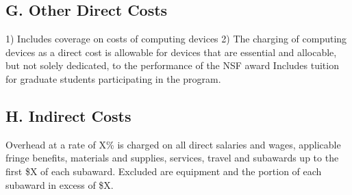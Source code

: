 \subsection*{G. Other Direct Costs}
1) Includes coverage on costs of computing devices
2) The charging of computing devices as a direct cost is allowable for devices that are essential and allocable, but not solely dedicated, to the performance of the NSF award
 Includes tuition for graduate students participating in the program.
\subsection*{H. Indirect Costs}
Overhead at a rate of X\% is charged on all direct salaries and wages, applicable fringe benefits, materials and supplies, services, travel and subawards up to the first \$X of each subaward. Excluded are equipment and the portion of each subaward in excess of \$X.
\fi
